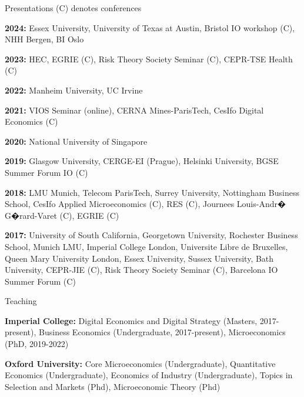 \documentclass{resume}
\begin{document}
\begin{rSection}{Presentations \tiny{(C) denotes conferences}}

\textbf{2024:} Essex University, University of Texas at Austin, Bristol IO workshop (C), NHH Bergen, BI Oslo

\textbf{2023:} HEC, EGRIE (C), Risk Theory Society Seminar (C), CEPR-TSE Health (C)

\textbf{2022:} Manheim University, UC Irvine

\textbf{2021:} VIOS Seminar (online), CERNA Mines-ParisTech, CesIfo Digital Economics (C)

\textbf{2020:} National University of Singapore

\textbf{2019:} Glasgow University, CERGE-EI (Prague), Helsinki University, BGSE Summer Forum IO (C)

\textbf{2018:} LMU Munich, Telecom ParisTech, Surrey University, Nottingham Business School, 
CesIfo Applied Microeconomics (C), RES (C), Journees Louis-Andr� G�rard-Varet (C), EGRIE (C)

\textbf{2017:} University of South California, Georgetown University, Rochester Business School, Munich LMU, 
Imperial College London, Universite Libre de Bruxelles, Queen Mary University London, 
Essex University, Sussex University, Bath University, CEPR-JIE (C), 
Risk Theory Society Seminar (C), Barcelona IO Summer Forum (C) 

\end{rSection}


\begin{rSection}{Teaching}

\textbf{Imperial College:} Digital Economics and Digital Strategy (Masters, 2017-present), Business Economics (Undergraduate, 2017-present), Microeconomics (PhD, 2019-2022)

\textbf{Oxford University:} Core Microeconomics (Undergraduate), Quantitative Economics (Undergraduate), Economics of Industry (Undergraduate), Topics in Selection and Markets (Phd), Microeconomic Theory (Phd)

\end{rSection}




\end{document}
